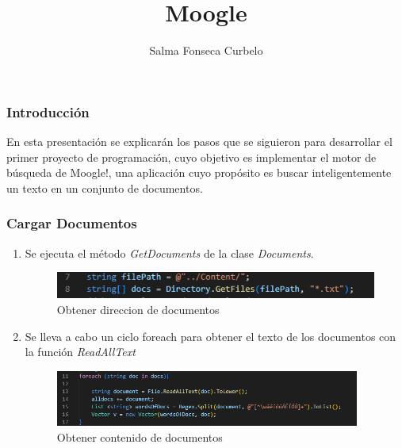 \documentclass{beamer}
\title{Moogle}
\author{Salma Fonseca Curbelo}
\begin{document}
\begin{frame}   
\maketitle
\end{frame}

\begin{frame}
    
    \frametitle{Introducción} 

    En esta presentación se explicarán los pasos que se siguieron para desarrollar el primer proyecto de programación,
    cuyo objetivo es  implementar el motor de búsqueda de Moogle!,
    una aplicación cuyo propósito es buscar inteligentemente un texto en un 
    conjunto de documentos.
    
\end{frame}

\begin{frame}
    \frametitle{Cargar Documentos}

\begin{enumerate}
    \item Se ejecuta el método \textit{GetDocuments} de la clase \textit{Documents}.
    \begin{figure}[h]

        \centering
        \label{imag: obtdocs}
        \includegraphics[width=11cm]{ObtenerDocs.png}
        \caption[]{\footnotesize Obtener direccion de documentos}

    \end{figure}

    \item Se lleva a cabo un ciclo foreach para obtener el texto de los documentos con la función \textit{ReadAllText}
    
    \begin{figure}[h]
        \centering
        \label{imag:cargardocs}
        \includegraphics[width=10cm]{CargarDocs.png}
        \caption[]{\footnotesize Obtener contenido de documentos}
    \end{figure}

\end{enumerate}
    
\end{frame}
\end{document}
